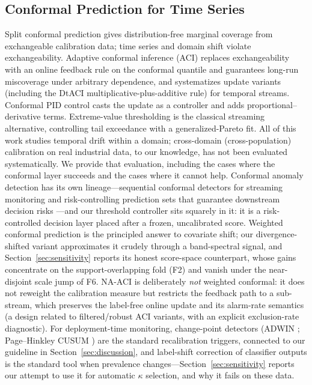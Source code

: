 \subsection{Conformal Prediction for Time Series}
Split conformal prediction \cite{lei2018} gives distribution-free marginal coverage from exchangeable calibration data; time series and domain shift violate exchangeability. Adaptive conformal inference (ACI) \cite{aci2021} replaces exchangeability with an online feedback rule on the conformal quantile and guarantees long-run miscoverage under arbitrary dependence, and \cite{dtaci2022} systematizes update variants (including the DtACI multiplicative-plus-additive rule) for temporal streams. Conformal PID control \cite{conformalpid2023} casts the update as a controller and adds proportional--derivative terms. Extreme-value thresholding \cite{siffer2017} is the classical streaming alternative, controlling tail exceedance with a generalized-Pareto fit. All of this work studies temporal drift within a domain; cross-domain (cross-population) calibration on real industrial data, to our knowledge, has not been evaluated systematically. We provide that evaluation, including the cases where the conformal layer succeeds and the cases where it cannot help. Conformal anomaly detection has its own lineage---sequential conformal detectors for streaming monitoring \cite{laxhammar2011} and risk-controlling prediction sets that guarantee downstream decision risks \cite{bates2021}---and our threshold controller sits squarely in it: it is a risk-controlled decision layer placed after a frozen, uncalibrated score. Weighted conformal prediction \cite{tibshirani2019} is the principled answer to covariate shift; our divergence-shifted variant approximates it crudely through a band-spectral signal, and Section~\ref{sec:sensitivity} reports its honest score-space counterpart, whose gains concentrate on the support-overlapping fold (F2) and vanish under the near-disjoint scale jump of F6. NA-ACI is deliberately \emph{not} weighted conformal: it does not reweight the calibration measure but restricts the feedback path to a sub-stream, which preserves the label-free online update and its alarm-rate semantics (a design related to filtered/robust ACI variants, with an explicit exclusion-rate diagnostic). For deployment-time monitoring, change-point detectors (ADWIN \cite{adwin2007}; Page--Hinkley CUSUM \cite{page1954}) are the standard recalibration triggers, connected to our guideline in Section~\ref{sec:discussion}, and label-shift correction of classifier outputs \cite{saerens2002,lipton2018} is the standard tool when prevalence changes---Section~\ref{sec:sensitivity} reports our attempt to use it for automatic $\kappa$ selection, and why it fails on these data.

